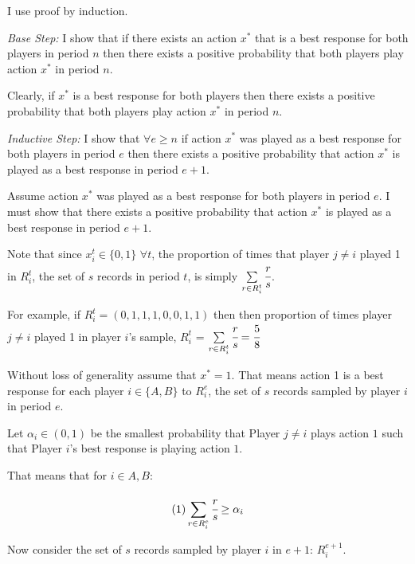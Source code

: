 \documentclass[12pt]{article}
\begin{document}
\vskip12pt

I use proof by induction.

\vskip12pt

\textit{Base Step:} I show that if there exists an action $x^*$ that is a best response for both players in period $n$ then there exists a positive probability that both players play action $x^*$ in period $n$.

\vskip6pt

Clearly, if $x^*$ is a best response for both players then there exists a positive probability that both players play action $x^*$ in period $n$.

\vskip12pt

\textit{Inductive Step:} I show that $\forall e \geq n$ if action $x^*$ was played as a best response for both players in period $e$ then there exists a positive probability that action $x^*$ is played as a best response in period $e+1$.

\vskip6pt

Assume action $x^*$ was played as a best response for both players in period $e$. I must show that there exists a positive probability that action $x^*$ is played as a best response in period $e+1$.

\vskip6pt

Note that since $x_i^t \in \{0,1\}$ \hspace{4pt} $\forall t$, the proportion of times that player $j \neq i$ played 1 in $R_i^t$, the set of $s$ records in period $t$, is simply $\sum\limits_{r \in R_i^t} \cfrac{r}{s}$.

For example, if $R_i^t = (0,1,1,1,0,0,1,1)$ then then proportion of times player $j \neq i$ played 1 in player $i$'s sample, $R_i^t$ = $\sum\limits_{r \in R_i^t} \cfrac{r}{s} = \cfrac{5}{8} $

Without loss of generality assume that $x^{*}=1$. That means action 1 is a best response for each player $i \in \{A,B\}$ to $R_i^{e}$, the set of $s$ records sampled by player $i$ in period $e$.

\vskip6pt

Let $\alpha_i \in (0,1)$ be the smallest probability that Player $j \neq i$ plays action $1$ such that Player $i$'s best response is playing action $1$.

That means that for $i \in {A, B}$:

$$ (1) \sum\limits_{r \in R_i^{e}} \cfrac{r}{s} \geq \alpha_i$$

Now consider the set of $s$ records sampled by player $i$ in $e+1$: $R_i^{e+1}$.
\end{document}
